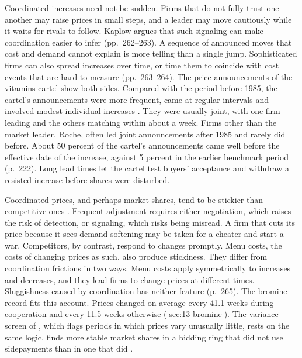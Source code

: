 Coordinated increases need not be sudden. Firms that do not fully trust one another may raise prices in small
steps, and a leader may move cautiously while it waits for rivals to follow. Kaplow argues that such signaling can
make coordination easier to infer (pp.~262--263). A sequence of announced moves that cost and demand cannot explain
is more telling than a single jump. Sophisticated firms can also spread increases over time, or time them to
coincide with cost events that are hard to measure (pp.~263--264). The price announcements of the vitamins cartel
show both sides. Compared with the period before 1985, the cartel's announcements were more frequent, came at
regular intervals and involved modest individual increases \citep[pp.~221--222]{MarshallMarx2012}. They were
usually joint, with one firm leading and the others matching within about a week. Firms other than the market
leader, Roche, often led joint announcements after 1985 and rarely did before. About 50 percent of the cartel's
announcements came well before the effective date of the increase, against 5 percent in the earlier benchmark
period (p.~222). Long lead times let the cartel test buyers' acceptance and withdraw a resisted increase before
shares were disturbed.

Coordinated prices, and perhaps market shares, tend to be stickier than competitive ones \citep[pp.~264--265]{Kaplow2013}.
Frequent adjustment requires either negotiation, which raises the risk of detection, or signaling, which risks
being misread. A firm that cuts its price because it sees demand softening may be taken for a cheater and start a
war. Competitors, by contrast, respond to changes promptly. Menu costs, the costs of changing prices as such, also
produce stickiness. They differ from coordination frictions in two ways. Menu costs apply symmetrically to
increases and decreases, and they lead firms to change prices at different times. Sluggishness caused by
coordination has neither feature (p.~265). The bromine record fits this account. Prices changed on average every
41.1 weeks during cooperation and every 11.5 weeks otherwise (\cref{sec:13-bromine}). The variance screen of
\citet{AbrantesMetzEtAl2006}, which flags periods in which prices vary unusually little, rests on the same logic.
\citet{Pesendorfer2000} finds more stable market shares in a bidding ring that did not use sidepayments than in one
that did \citep[p.~264, note~17]{Kaplow2013}.

